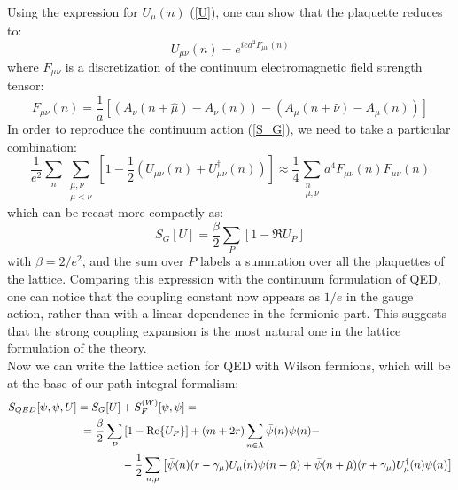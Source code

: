 Using the expression for $U_\mu(n)$ (\ref{U}), one can show that the plaquette reduces to:
\begin{equation}
    U_{\mu\nu}(n) = e^{iea^2F_{\mu\nu}(n)}
\end{equation}
where $F_{\mu\nu}$ is a discretization of the continuum electromagnetic field strength tensor:
\begin{equation}
    F_{\mu\nu}(n) = \frac{1}{a}\left[(A_\nu(n + \hat{\mu}) - A_\nu(n)) - (A_\mu(n + \hat{\nu}) - A_\mu(n)) \right]
\end{equation}
In order to reproduce the continuum action (\ref{S_G}), we need to take a particular combination:
\begin{equation}
    \frac{1}{e^2} \sum_n \sum_{\substack{\mu, \nu \\ \mu < \nu}} \left[1 - \frac{1}{2} \left(U_{\mu\nu}(n) + U_{\mu\nu}^\dagger(n)\right) \right] \approx \frac{1}{4} \sum_{\substack{n \\ \mu, \nu}} a^4 F_{\mu\nu}(n) F_{\mu\nu}(n)
\end{equation}
which can be recast more compactly as:
\begin{equation}
    S_G [U] = \frac{\beta}{2} \sum_P \left[1 - \Re{U_P} \right]
\end{equation}
with $\beta = 2/e^2$, and the sum over $P$ labels a summation over all the plaquettes of the lattice. Comparing this expression with the continuum formulation of QED, one can notice that the coupling constant now appears as $1/e$ in the gauge action, rather than with a linear dependence in the fermionic part. This suggests that the strong coupling expansion is the most natural one in the lattice formulation of the theory.
\\ Now we can write the lattice action for QED with Wilson fermions, which will be at the base of our path-integral formalism:
\begin{equation}\label{S qed lattice}
    \begin{split}
       & S_{QED} [\psi, \Bar{\psi}, U] = S_G[U] + S_F^{(W)} [\psi, \Bar{\psi}] = \\
       & \hspace{23 mm} = \frac{\beta}{2} \sum_P \left[1 - \Re{U_P} \right] + (m + 2r) \sum_{n \in \Lambda} \Bar{\psi}(n) \psi(n) - \\
       & \hspace{36 mm} - \frac{1}{2} \sum_{n, \mu} \left[ \Bar{\psi}(n) (r - \gamma_\mu) U_\mu(n) \psi(n + \hat{\mu}) + \Bar{\psi}(n + \hat{\mu}) (r + \gamma_\mu) U_\mu^\dagger(n) \psi(n) \right] \\
    \end{split}
\end{equation}

